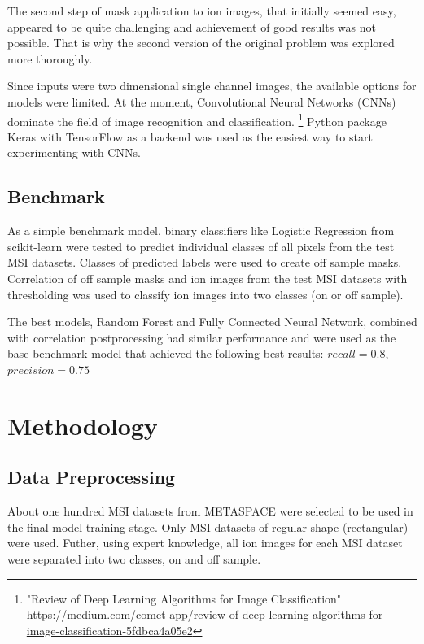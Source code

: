 \documentclass[a4paper]{article}
\begin{document}
The second step of mask application to ion images, that initially seemed easy, appeared to be
quite challenging and achievement of good results was not possible.
That is why the second version of the original problem was explored more thoroughly.

Since inputs were two dimensional single channel images, the available options for models were limited.
At the moment, Convolutional Neural Networks (CNNs) dominate the field of image recognition and classification.
\footnote{"Review of Deep Learning Algorithms for Image Classification"
    \url{https://medium.com/comet-app/review-of-deep-learning-algorithms-for-image-classification-5fdbca4a05e2}}
Python package Keras with TensorFlow as a backend was used as the easiest way to start experimenting with CNNs.

\newpage
\subsection*{Benchmark}

As a simple benchmark model, binary classifiers like Logistic Regression from scikit-learn were
tested to predict individual classes of all pixels from the test MSI datasets.
Classes of predicted labels were used to create off sample masks.
Correlation of off sample masks and ion images from the test MSI datasets
with thresholding was used to classify ion images into two classes (on or off sample).

The best models, Random Forest and Fully Connected Neural Network, combined with correlation postprocessing
had similar performance and were used as the base benchmark model that achieved the following best results:
$recall=0.8$, $precision=0.75$

\section*{Methodology}

\subsection*{Data Preprocessing}

About one hundred MSI datasets from METASPACE were selected to be used in the final model training stage.
Only MSI datasets of regular shape (rectangular) were used. Futher, using expert knowledge,
all ion images for each MSI dataset were separated into two classes, on and off sample.
\end{document}
